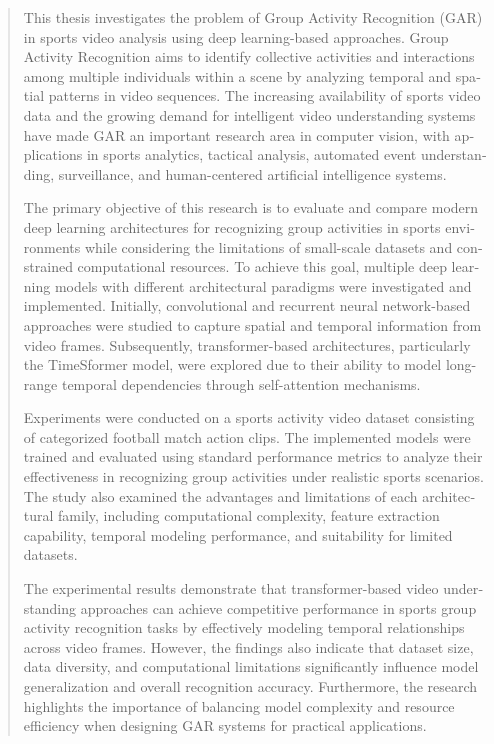 \documentclass[12pt]{report}
\begin{document}
\begin{latin}
\begin{abstract}
This thesis investigates the problem of Group Activity Recognition (GAR) in sports video analysis using deep learning-based approaches. Group Activity Recognition aims to identify collective activities and interactions among multiple individuals within a scene by analyzing temporal and spatial patterns in video sequences. The increasing availability of sports video data and the growing demand for intelligent video understanding systems have made GAR an important research area in computer vision, with applications in sports analytics, tactical analysis, automated event understanding, surveillance, and human-centered artificial intelligence systems.

The primary objective of this research is to evaluate and compare modern deep learning architectures for recognizing group activities in sports environments while considering the limitations of small-scale datasets and constrained computational resources. To achieve this goal, multiple deep learning models with different architectural paradigms were investigated and implemented. Initially, convolutional and recurrent neural network-based approaches were studied to capture spatial and temporal information from video frames. Subsequently, transformer-based architectures, particularly the TimeSformer model, were explored due to their ability to model long-range temporal dependencies through self-attention mechanisms.

Experiments were conducted on a sports activity video dataset consisting of categorized football match action clips. The implemented models were trained and evaluated using standard performance metrics to analyze their effectiveness in recognizing group activities under realistic sports scenarios. The study also examined the advantages and limitations of each architectural family, including computational complexity, feature extraction capability, temporal modeling performance, and suitability for limited datasets.

The experimental results demonstrate that transformer-based video understanding approaches can achieve competitive performance in sports group activity recognition tasks by effectively modeling temporal relationships across video frames. However, the findings also indicate that dataset size, data diversity, and computational limitations significantly influence model generalization and overall recognition accuracy. Furthermore, the research highlights the importance of balancing model complexity and resource efficiency when designing GAR systems for practical applications.


\end{abstract}
\end{latin}
\end{document}
